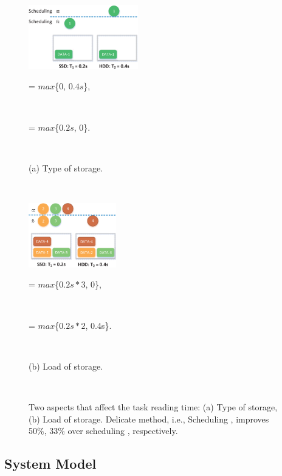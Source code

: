\documentclass[conference]{IEEEtran}
\begin{document}
\begin{figure}[!t]
\centering
    \begin{minipage}{4.78cm}
        \includegraphics[height = 2.8cm]{fig_example1_5.eps}
        \centerline{\footnotesize{\uppercase\expandafter{} = $max$\{0, $0.4s$\},\quad}}\\
        \centerline{\footnotesize{\uppercase\expandafter{} = $max$\{$0.2s$, 0\}.\quad}}\\
         \centerline{(a) Type of storage.}\\
    \end{minipage}
    \begin{minipage}{3.95cm}
        \includegraphics[height = 2.8cm]{fig_example2_4.eps}
        \centerline{\footnotesize{\uppercase\expandafter{} = $max$\{$0.2s*3$, 0\},\quad}}\\
        \centerline{\footnotesize{\uppercase\expandafter{} = $max$\{$0.2s*2$, 0.4s\}.}}\\
         \centerline{(b) Load of storage.\quad}\\
    \end{minipage}
    \vspace{-0.4cm}
    \caption{Two aspects that affect the task reading time: (a) Type of storage, (b) Load of storage. Delicate method, i.e., Scheduling \uppercase\expandafter{}, improves 50\%, 33\% over scheduling \uppercase\expandafter{}, respectively.}
    \label{Fig:example}
    \vspace{-0.4cm}
\end{figure}

\subsection{System Model}
\end{document}
